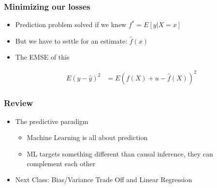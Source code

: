 \documentclass[
  shownotes,
  xcolor={svgnames},
  hyperref={colorlinks,citecolor=DarkBlue,linkcolor=andesred,urlcolor=DarkBlue}
  , aspectratio=169]{beamer}
\begin{document}
\begin{frame}
\frametitle{Minimizing our losses}

\begin{itemize}
\item Prediction problem solved if we knew $f^* = E[y|X=x]$ 
\pause
\medskip
\item But we have to settle for an estimate: $\hat{f}(x)$
\medskip
\item The EMSE of this

\begin{align}
E(y-\hat y)^2 &= E(f(X)+u - \hat f(X))^2 
\end{align}
\end{itemize}

\end{frame}




\begin{frame}[fragile]
\frametitle{Review}
  

\begin{itemize}
 \item The predictive paradigm 
 \medskip
    \begin{itemize} 
        \item Machine Learning is all about prediction
         \medskip
         \item ML targets something different than causal inference, they can complement each other
         \medskip
         
      \end{itemize}
  \item Next Class: Bias/Variance Trade Off and Linear Regression

    \end{itemize}

\end{frame}



\end{document}
